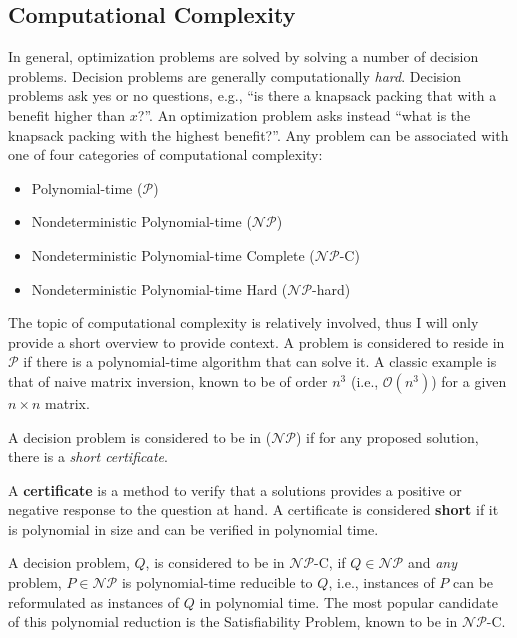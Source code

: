 \subsection{Computational Complexity}\label{sec:complexity}

In general, optimization problems are solved by solving a number of decision
problems. Decision problems are generally
computationally \textit{hard}. Decision problems ask yes or no questions,
e.g., ``is there a knapsack packing that with a benefit higher than $x$?''. An
optimization problem asks instead ``what is the knapsack packing with the
highest benefit?''. Any problem can be associated with one of four categories of
computational complexity:

\begin{itemize}
        \item Polynomial-time ($\mathcal{P}$)
        \item Nondeterministic Polynomial-time ($\mathcal{NP}$)
        \item Nondeterministic Polynomial-time Complete  ($\mathcal{NP}$-C)
        \item Nondeterministic Polynomial-time Hard  ($\mathcal{NP}$-hard)
\end{itemize}

The topic of computational complexity is relatively involved, thus I will only
provide a short overview to provide context. A problem is considered to reside
in $\mathcal{P}$ if there is a polynomial-time algorithm that can solve it. A
classic example is that of naive matrix inversion, known to be of order $n^3$
(i.e., $\mathcal{O}(n^3)$) for a given $n \times n$ matrix.

A decision problem is considered to be in ($\mathcal{NP}$) if for any proposed
solution, there is a \textit{short certificate}.

\begin{define}
A \textbf{certificate} is a method to verify that a solutions provides a
positive or negative response to the question at hand. A certificate is
considered \textbf{short} if it is polynomial in size and can be verified in
polynomial time.
\end{define}

A decision problem, $Q$, is considered to be in $\mathcal{NP}$-C, if
$Q \in \mathcal{NP}$ and \textit{any} problem, $P \in \mathcal{NP}$ is
polynomial-time reducible to $Q$, i.e., instances of $P$ can be reformulated as
instances of $Q$ in polynomial time. The most popular candidate of this
polynomial reduction is the Satisfiability Problem, known to be in
$\mathcal{NP}$-C.

